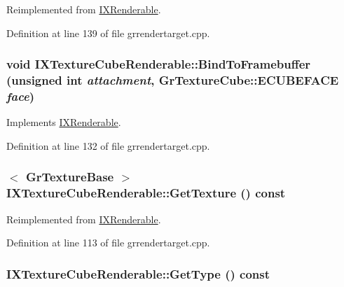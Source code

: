 Reimplemented from \hyperlink{class_i_x_renderable_4e47253020e9f0faabb51b37ee5e16ae}{IXRenderable}.

Definition at line 139 of file grrendertarget.cpp.\hypertarget{class_i_x_texture_cube_renderable_01b1752841e74a9aa60229c855abcbac}{
\subsubsection[{BindToFramebuffer}]{\setlength{\rightskip}{0pt plus 5cm}void IXTextureCubeRenderable::BindToFramebuffer (unsigned int {\em attachment}, \/  {\bf GrTextureCube::ECUBEFACE} {\em face})}}
\label{class_i_x_texture_cube_renderable_01b1752841e74a9aa60229c855abcbac}




Implements \hyperlink{class_i_x_renderable_c5ea40caedef9885429ab5c7dccb0163}{IXRenderable}.

Definition at line 132 of file grrendertarget.cpp.\hypertarget{class_i_x_texture_cube_renderable_35c6be6d9d46593905c7bc41925115a5}{
\subsubsection[{GetTexture}]{$<$ {\bf GrTextureBase} $>$ IXTextureCubeRenderable::GetTexture () const}}
\label{class_i_x_texture_cube_renderable_35c6be6d9d46593905c7bc41925115a5}




Reimplemented from \hyperlink{class_i_x_renderable_2a74a8b8f702af0557134858ec263aea}{IXRenderable}.

Definition at line 113 of file grrendertarget.cpp.\hypertarget{class_i_x_texture_cube_renderable_f6645f105588b641271bbb4f33f72037}{
\subsubsection[{GetType}]{ IXTextureCubeRenderable::GetType () const}}
\label{class_i_x_texture_cube_renderable_f6645f105588b641271bbb4f33f72037}




